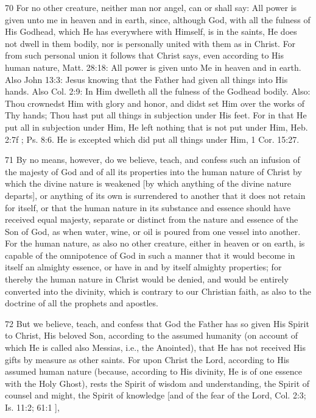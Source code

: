 {70 For no other creature, neither man nor angel, can or shall say: All power is given unto me in heaven and in earth, since, although God, with all the fulness of His Godhead, which He has everywhere with Himself, is in the saints, He does not dwell in them bodily, nor is personally united with them as in Christ. For from such personal union it follows that Christ says, even according to His human nature, Matt. 28:18: All power is given unto Me in heaven and in earth. Also John 13:3: Jesus knowing that the Father had given all things into His hands. Also Col. 2:9: In Him dwelleth all the fulness of the Godhead bodily. Also: Thou crownedst Him with glory and honor, and didst set Him over the works of Thy hands; Thou hast put all things in subjection under His feet. For in that He put all in subjection under Him, He left nothing that is not put under Him, Heb. 2:7f ; Ps. 8:6. He is excepted which did put all things under Him, 1 Cor. 15:27.

71 By no means, however, do we believe, teach, and confess such an infusion of the majesty of God and of all its properties into the human nature of Christ by which the divine nature is weakened [by which anything of the divine nature departs], or anything of its own is surrendered to another that it does not retain for itself, or that the human nature in its substance and essence should have received equal majesty, separate or distinct from the nature and essence of the Son of God, as when water, wine, or oil is poured from one vessel into another. For the human nature, as also no other creature, either in heaven or on earth, is capable of the omnipotence of God in such a manner that it would become in itself an almighty essence, or have in and by itself almighty properties; for thereby the human nature in Christ would be denied, and would be entirely converted into the divinity, which is contrary to our Christian faith, as also to the doctrine of all the prophets and apostles.

72 But we believe, teach, and confess that God the Father has so given His Spirit to Christ, His beloved Son, according to the assumed humanity (on account of which He is called also Messias, i.e., the Anointed), that He has not received His gifts by measure as other saints. For upon Christ the Lord, according to His assumed human nature (because, according to His divinity, He is of one essence with the Holy Ghost), rests the Spirit of wisdom and understanding, the Spirit of counsel and might, the Spirit of knowledge [and of the fear of the Lord, Col. 2:3; Is. 11:2; 61:1 ],

}
